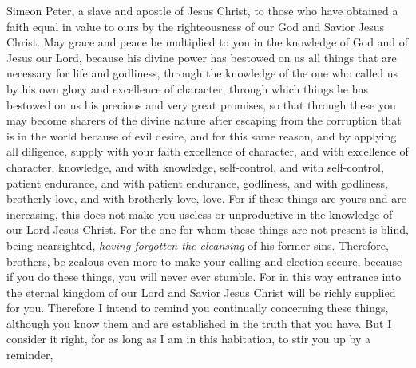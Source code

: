 
\begin{biblechapter} %
 Simeon Peter, a slave and apostle of Jesus Christ, to those who have obtained a faith equal in value to ours by the righteousness of our God and Savior Jesus Christ.
\verse May grace and peace be multiplied to you in the knowledge of God and of Jesus our Lord,
\verse because his divine power has bestowed on us all things that are necessary for life and godliness, through the knowledge of the one who called us by his own glory and excellence of character,
\verse through which things he has bestowed on us his precious and very great promises, so that through these you may become sharers of the divine nature after escaping from the corruption that is in the world because of evil desire,
\verse and for this same reason, and by applying all diligence, supply with your faith excellence of character, and with excellence of character, knowledge,
\verse and with knowledge, self-control, and with self-control, patient endurance, and with patient endurance, godliness,
\verse and with godliness, brotherly love, and with brotherly love, love.
 For if these things are yours and are increasing, this does not make you useless or unproductive in the knowledge of our Lord Jesus Christ.
\verse For the one for whom these things are not present is blind, being nearsighted, \textit{having forgotten the cleansing} of his former sins.
\verse Therefore, brothers, be zealous even more to make your calling and election secure, because if you do these things, you will never ever stumble.
\verse For in this way entrance into the eternal kingdom of our Lord and Savior Jesus Christ will be richly supplied for you.
\verse Therefore I intend to remind you continually concerning these things, although you know them and are established in the truth that you have.
\verse But I consider it right, for as long as I am in this habitation, to stir you up by a reminder,

\end{biblechapter}
